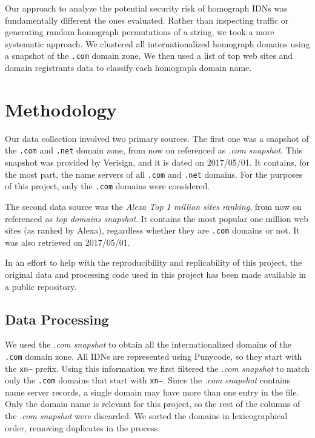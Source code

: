 \documentclass[letterpaper,twocolumn,10pt]{article}
\begin{document}
Our approach to analyze the potential security risk of homograph IDNs was fundamentally different the ones evaluated.
Rather than inspecting traffic or generating random homograph permutations of a string, we took a more systematic approach.
We clustered all internationalized homograph domains using a snapshot of the \texttt{.com} domain zone.
We then used a list of top web sites and domain registrants data to classify each homograph domain name.

\section{Methodology}
Our data collection involved two primary sources.
The first one was a snapshot of the \texttt{.com} and \texttt{.net} domain zone, from now on referenced as \textit{.com snapshot}.
This snapshot was provided by Verisign, and it is dated on 2017/05/01.
It contains, for the most part, the name servers of all \texttt{.com} and \texttt{.net} domains.
For the purposes of this project, only the \texttt{.com} domains were considered.

The second data source was the \textit{Alexa Top 1 million sites ranking}, from now on referenced as \textit{top domains snapshot}.
It contains the most popular one million web sites (as ranked by Alexa), regardless whether they are \texttt{.com} domains or not.
It was also retrieved on 2017/05/01.

In an effort to help with the reproducibility and replicability of this project, the original data and processing code used in this project has been made available in a public repository.

\subsection{Data Processing}
We used the \textit{.com snapshot} to obtain all the internationalized domains of the \texttt{.com} domain zone.
All IDNs are represented using Punycode, so they start with the \texttt{xn--} prefix.
Using this information we first filtered the \textit{.com snapshot} to match only the \texttt{.com} domains that start with \texttt{xn--}.
Since the \textit{.com snapshot} contains name server records, a single domain may have more than one entry in the file.
Only the domain name is relevant for this project, so the rest of the columns of the \textit{.com snapshot} were discarded.
We sorted the domains in lexicographical order, removing duplicates in the process.
\end{document}
